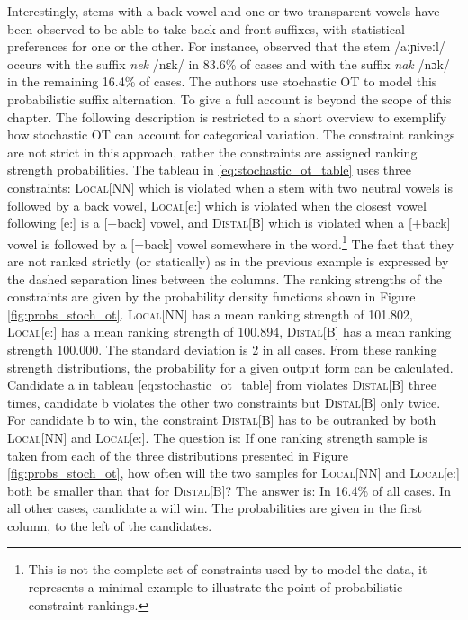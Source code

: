 Interestingly, stems with a back vowel and one or two transparent vowels have been observed to be able to take back and front suffixes, with statistical preferences for one or the other. For instance, \citet{HayesLonde2006} observed that the stem /aːɲiveːl/ occurs with the suffix \emph{nek} /nɛk/ in 83.6\% of cases and with the suffix \emph{nak} /nɔk/ in the remaining 16.4\% of cases. The authors use stochastic OT \citep{Boersma1997,BoersmaHayes2001} to model this probabilistic suffix alternation. To give a full account is beyond the scope of this chapter. The following description is restricted to a short overview to exemplify how stochastic OT can account for categorical variation. The constraint rankings are not strict in this approach, rather the constraints are assigned ranking strength probabilities. The tableau in \ref{eq:stochastic_ot_table} uses three constraints: \textsc{Local[NN]} which is violated when a stem with two neutral vowels is followed by a back vowel, \textsc{Local}[e:] which is violated when the closest vowel following [e:] is a [+back] vowel, and \textsc{Distal[B]} which is violated when a [+back] vowel is followed by a [$-$back] vowel somewhere in the word.\footnote{This is not the complete set of constraints used by \citet{HayesLonde2006} to model the data, it represents a minimal example to illustrate the point of probabilistic constraint rankings.} The fact that they are not ranked strictly (or statically) as in the previous example is expressed by the dashed separation lines between the columns. The ranking strengths of the constraints are given by the probability density functions shown in Figure \ref{fig:probs_stoch_ot}. \textsc{Local[NN]} has a mean ranking strength of 101.802, \textsc{Local}[e:] has a mean ranking strength of 100.894, \textsc{Distal[B]} has a mean ranking strength 100.000. The standard deviation is 2 in all cases. From these ranking strength distributions, the probability for a given output form can be calculated. Candidate a in tableau \ref{eq:stochastic_ot_table} from \citet[81]{HayesLonde2006} violates \textsc{Distal[B]} three times, candidate b violates the other two constraints but \textsc{Distal[B]} only twice. For candidate b to win, the constraint \textsc{Distal[B]} has to be outranked by both \textsc{Local[NN]} and \textsc{Local}[e:]. The question is: If one ranking strength sample is taken from each of the three distributions presented in Figure \ref{fig:probs_stoch_ot}, how often will the two samples for \textsc{Local[NN]} and \textsc{Local}[e:] both be smaller than that for \textsc{Distal[B]}? The answer is: In 16.4\% of all cases. In all other cases, candidate a will win. The probabilities are given in the first column, to the left of the candidates.

